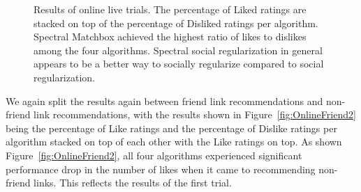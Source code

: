 \begin{figure}[t!]
\centering
{}
\caption{Results of online live trials. The percentage of Liked ratings are stacked on top of the percentage of Disliked ratings per algorithm. Spectral Matchbox achieved the highest ratio of likes to dislikes among the four algorithms. Spectral social regularization in general appears to be a better way to socially regularize compared to social regularization.}
\label{fig:online2}
\end{figure}

We again split the results again between friend link recommendations and non-friend link recommendations, with the results shown in Figure~\ref{fig:OnlineFriend2} being the percentage of Like ratings and the percentage of Dislike ratings per algorithm stacked on top of each other with the Like ratings on top.
 As shown Figure~\ref{fig:OnlineFriend2}, all four algorithms experienced significant performance drop in the number of likes when it came to recommending non-friend links. This reflects the results of the first trial. 
 

